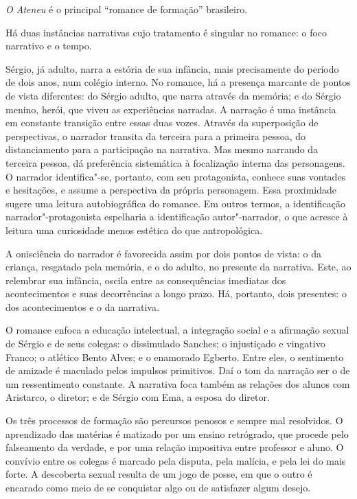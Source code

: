 \textit{O Ateneu} é o principal ``romance de
formação'' brasileiro.

Há duas instâncias narrativas cujo tratamento é singular no romance: o
foco narrativo e o tempo.

Sérgio, já adulto, narra a estória de sua infância, mais precisamente do
período de dois anos, num colégio interno. No romance, há a presença
marcante de pontos de vista diferentes: do Sérgio adulto, que narra
através da memória; e do Sérgio menino, herói, que viveu as
experiências narradas. A narração é uma instância em constante
transição entre essas duas vozes. Através da superposição de
perspectivas, o narrador transita da terceira para a primeira pessoa,
do distanciamento para a participação na narrativa. Mas mesmo narrando
da terceira pessoa, dá preferência sistemática à focalização interna
das personagens. O narrador identifica"-se, portanto, com seu
protagonista, conhece suas vontades e hesitações, e assume a
perspectiva da própria personagem. Essa proximidade sugere uma leitura
autobiográfica do romance. Em outros termos, a identificação
narrador"-protagonista espelharia a identificação autor"-narrador, o
que acresce à leitura uma curiosidade menos estética do que antropológica. 

A onisciência do narrador é favorecida assim por dois pontos de vista: o
da criança, resgatado pela memória, e o do adulto, no presente da
narrativa. Este, ao relembrar sua infância, oscila entre as
consequências imediatas dos acontecimentos e suas decorrências a longo
prazo. Há, portanto, dois presentes: o dos acontecimentos e o da narrativa.

O romance enfoca a educação intelectual, a integração social e a
afirmação sexual de Sérgio e de seus colegas: o dissimulado Sanches; o
injustiçado e vingativo Franco; o atlético Bento
Alves; e o enamorado Egberto. Entre eles, o sentimento de amizade é
maculado pelos impulsos primitivos. Daí o tom da narração ser o de um
ressentimento constante. A narrativa foca também as relações dos alunos
com Aristarco, o diretor; e de Sérgio com Ema, a esposa do diretor.

Os três processos de formação são percursos penosos e sempre mal
resolvidos. O aprendizado das matérias é matizado por um ensino
retrógrado, que procede pelo falseamento da verdade, e por uma relação
impositiva entre professor e aluno. O convívio entre os colegas é
marcado pela disputa, pela malícia, e pela lei do mais forte. A
descoberta sexual resulta de um jogo de posse, em que o outro é
encarado como meio de se conquistar algo ou de satisfazer algum desejo.

